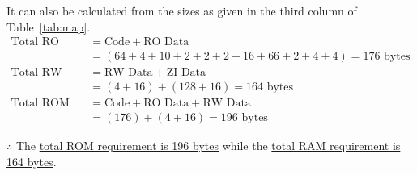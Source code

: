 It can also be calculated from the sizes as given in the third column of Table~\ref{tab:map}.
\begin{align*}
    \text{Total RO size}
     & =
    \text{Code} + \text{RO Data}
    \\ & =
    (64 + 4 + 10 + 2 + 2 + 2 + 16 + 66 + 2 + 4 + 4)
    = 176 \text{ bytes}
    \\
    \text{Total RW size}
     & =
    \text{RW Data} + \text{ZI Data}
    \\ & =
    (4 + 16) + (128 + 16) = 164 \text{ bytes}
    \\
    \text{Total ROM size}
     & =
    \text{Code} + \text{RO Data} + \text{RW Data}
    \\ & =
    (176) + (4 + 16) = 196 \text{ bytes}
\end{align*}

\( \therefore \) The \underline{total ROM requirement is 196 bytes} while the \underline{total RAM requirement is 164 bytes}.
